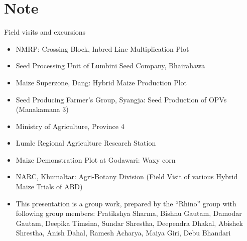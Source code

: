 \documentclass[11pt,dvipsnames,ignorenonframetext,aspectratio=169]{beamer}
\providecommand{\tightlist}{%
  \setlength{\itemsep}{0pt}\setlength{\parskip}{0pt}}
\begin{document}
\hypertarget{note}{%
\section{Note}\label{note}}

\begin{frame}{Field visits and excursions}
\protect\hypertarget{field-visits-and-excursions}{}


\begin{itemize}
\tightlist
\item
  NMRP: Crossing Block, Inbred Line Multiplication Plot
\item
  Seed Processing Unit of Lumbini Seed Company, Bhairahawa
\item
  Maize Superzone, Dang: Hybrid Maize Production Plot
\item
  Seed Producing Farmer's Group, Syangja: Seed Production of OPVs
  (Manakamana 3)
\item
  Ministry of Agriculture, Province 4
\item
  Lumle Regional Agriculture Research Station
\item
  Maize Demonstration Plot at Godawari: Waxy corn
\item
  NARC, Khumaltar: Agri-Botany Division (Field Visit of various Hybrid
  Maize Trials of ABD)
\end{itemize}

\end{frame}

\begin{frame}{}
\protect\hypertarget{section-4}{}

\begin{itemize}
\tightlist
\item
  This presentation is a group work, prepared by the ``Rhino'' group
  with following group members: Pratikshya Sharma, Bishnu Gautam,
  Damodar Gautam, Deepika Timsina, Sundar Shrestha, Deependra Dhakal,
  Abishek Shrestha, Anish Dahal, Ramesh Acharya, Maiya Giri, Debu
  Bhandari
\end{itemize}

\end{frame}
\end{document}
